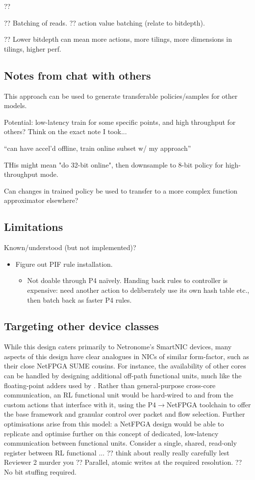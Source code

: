\documentclass[sigconf,natbib=false]{acmart}
\begin{document}
?? 

?? Batching of reads. ?? action value batching  (relate to bitdepth).

?? Lower bitdepth can mean more actions, more tilings, more dimensions in tilings, higher perf.

\subsection{Notes from chat with others}
This approach can be used to generate transferable policies/samples for other models.

Potential: low-latency train for some specific points, and high throughput for others? Think on the exact note I took...

``can have accel'd offline, train online subset w/ my approach''

THis might mean "do 32-bit online", then downsample to 8-bit policy for high-throughput mode.

Can changes in trained policy be used to transfer to a more complex function approximator elsewhere?

\subsection{Limitations}
Known/understood (but not implemented)?
\begin{itemize}
	\item Figure out PIF rule installation.
	\begin{itemize}
		\item Not doable through P4 na\"{i}vely. Handing back rules to controller is expensive: need another action to deliberately use its own hash table etc., then batch back as faster P4 rules.
	\end{itemize}
\end{itemize}

\subsection{Targeting other device classes}
While this design caters primarily to Netronome's SmartNIC devices, many aspects of this design have clear analogues in NICs of similar form-factor, such as their close NetFPGA SUME cousins.
For instance, the availability of other cores can be handled by designing additional off-path functional units, much like the floating-point adders used by \textcite{DBLP:conf/isca/LiLYCSH19}.
Rather than general-purpose cross-core communication, an RL functional unit would be hard-wired to and from the custom actions that interface with it, using the P4$\rightarrow$NetFPGA toolchain to offer the base framework and granular control over packet and flow selection.
Further optimisations arise from this model: a NetFPGA design would be able to replicate and optimise further on this concept of dedicated, low-latency communication between functional units.
Consider a single, shared, read-only register between RL functional ...
?? think about really really carefully lest Reviewer 2 murder you
?? Parallel, atomic writes at the required resolution.
?? No bit stuffing required.
\end{document}
